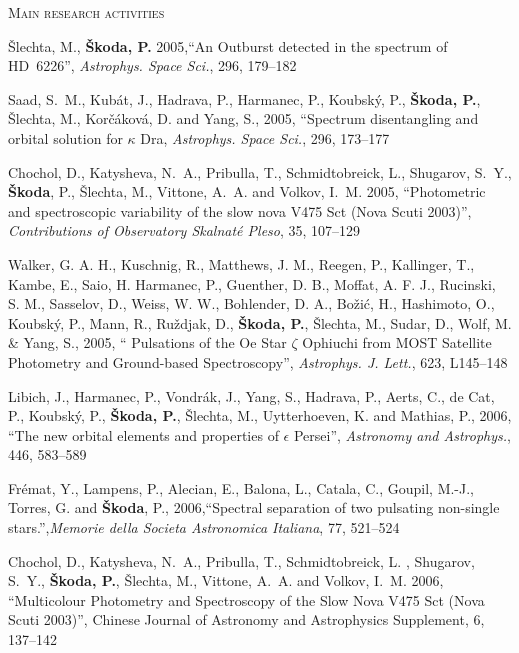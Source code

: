 \begin{cv}
\begin{cvlist}{\large \textsc{Main research activities}}
\item \v{S}lechta, M., {\bf \v{S}koda, P.} 2005,``An Outburst detected  in the
spectrum of HD~6226'', {\em Astrophys. Space Sci.\/}, 296, 179--182

\item Saad, S.~M., Kub\'at, J., Hadrava, P., Harmanec, P., Koubsk\'y, P., {\bf
\v{S}koda, P.}, \v{S}lechta, M., Kor\v{c}\'akov\'a, D. and Yang, S., 2005,
``Spectrum disentangling and orbital solution  for $\kappa$ Dra, {\em Astrophys.
Space Sci.\/}, 296, 173--177

\item {Chochol}, D., {Katysheva}, N.~A., {Pribulla}, T., {Schmidtobreick}, L.,
{Shugarov}, S.~Y., {\bf{\v S}koda}, P., \v{S}lechta, M., Vittone, A.~A. and
Volkov, I.~M. 2005, ``Photometric and spectroscopic variability of the slow
nova V475 Sct (Nova Scuti 2003)'',  {\em Contributions of Observatory Skalnat\'e
Pleso\/}, 35, 107--129

\item Walker, G. A. H., Kuschnig, R., Matthews, J. M., Reegen, P., Kallinger,
T., Kambe, E., Saio, H. Harmanec, P., Guenther, D. B., Moffat, A. F. J.,
Rucinski, S. M., Sasselov, D., Weiss, W. W., Bohlender, D. A., Bo\v{z}i\'c, H.,
Hashimoto, O., Koubsk\'y, P., Mann, R., Ru\v{z}djak, D., {\bf \v{S}koda, P.},
\v{S}lechta, M., Sudar, D., Wolf, M. \&  Yang, S., 2005, {``
Pulsations of the Oe Star $\zeta$ Ophiuchi from MOST Satellite Photometry 
and Ground-based Spectroscopy''}, {\em Astrophys. J.  Lett.\/}, {623}, {L145--148}

\item {Libich}, J., {Harmanec}, P., {Vondr{\'a}k}, J.,  {Yang}, S., {Hadrava},
P., {Aerts}, C., {de Cat}, P.,  {Koubsk{\'y}}, P., {\bf {\v S}koda, P.}, {{\v
S}lechta}, M.,  {Uytterhoeven}, K. and {Mathias}, P., 2006, ``The new orbital
elements and properties of {$\epsilon$} Persei'', {\em Astronomy and
Astrophys.\/}, 446, 583--589

\item Fr{\'e}mat, Y., {Lampens}, P., {Alecian}, E., {Balona}, L., {Catala}, C.,
{Goupil}, M.-J., {Torres}, G. and {\bf {\v S}koda}, P., 2006,``Spectral
separation of two pulsating non-single stars.'',{\em  Memorie della Societa
Astronomica Italiana\/}, 77, 521--524


\item {Chochol}, D., {Katysheva}, N.~A., {Pribulla}, T., {Schmidtobreick}, L.
, {Shugarov}, S.~Y., {\bf{\v S}koda, P.}, \v{S}lechta, M., Vittone, A.~A. and
Volkov, I.~M. 2006, {``Multicolour Photometry and Spectroscopy of the Slow Nova
V475 Sct (Nova Scuti 2003)''}, Chinese Journal of Astronomy and Astrophysics
Supplement, 6, 137--142


\end{cvlist}
\end{cv}
